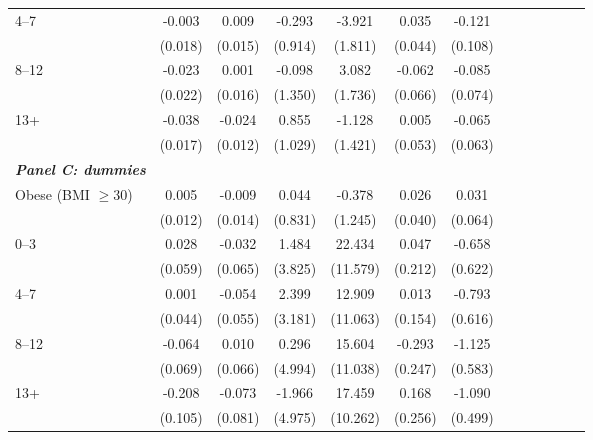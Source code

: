\documentclass[12pt,english]{article}
\begin{document}
\begin{table}[!ht]
\begin{center}
\begin{adjustbox}{max width=.9\linewidth}
\begin{threeparttable}
{\begin{tabular}{l*{6}{S S}}
						4--7 &    -0.003         &    0.009         &   -0.293         &   -3.921\sym{**} &    0.035         &   -0.121         \\
						&  (0.018)         &  (0.015)         &  (0.914)         &  (1.811)         &  (0.044)         &  (0.108)         \\
						8--12 &    -0.023         &    0.001         &   -0.098         &    3.082\sym{*}  &   -0.062         &   -0.085         \\
						&  (0.022)         &  (0.016)         &  (1.350)         &  (1.736)         &  (0.066)         &  (0.074)         \\
						13+ &    -0.038\sym{**} &   -0.024\sym{*}  &    0.855         &   -1.128         &    0.005         &   -0.065         \\
						&  (0.017)         &  (0.012)         &  (1.029)         &  (1.421)         &  (0.053)         &  (0.063)         \\
						\textit{\textbf{Panel C: dummies}} &&&&&&\\
						Obese (BMI $\geq 30$)&    0.005         &   -0.009         &    0.044         &   -0.378         &    0.026         &    0.031         \\
						&  (0.012)         &  (0.014)         &  (0.831)         &  (1.245)         &  (0.040)         &  (0.064)         \\
						0--3&   0.028         &   -0.032         &    1.484         &   22.434\sym{*}  &    0.047         &   -0.658         \\
						&  (0.059)         &  (0.065)         &  (3.825)         & (11.579)         &  (0.212)         &  (0.622)         \\
						4--7&    0.001         &   -0.054         &    2.399         &   12.909         &    0.013         &   -0.793         \\
						&  (0.044)         &  (0.055)         &  (3.181)         & (11.063)         &  (0.154)         &  (0.616)         \\
						8--12&   -0.064         &    0.010         &    0.296         &   15.604         &   -0.293         &   -1.125\sym{*}  \\
						&  (0.069)         &  (0.066)         &  (4.994)         & (11.038)         &  (0.247)         &  (0.583)         \\
						13+& -0.208\sym{**} &   -0.073         &   -1.966         &   17.459\sym{*}  &    0.168         &   -1.090\sym{**} \\
						&  (0.105)         &  (0.081)         &  (4.975)         & (10.262)         &  (0.256)         &  (0.499)         \\

\end{tabular}}
\end{threeparttable}
\end{adjustbox}
\end{center}
\end{table}
\end{document}
